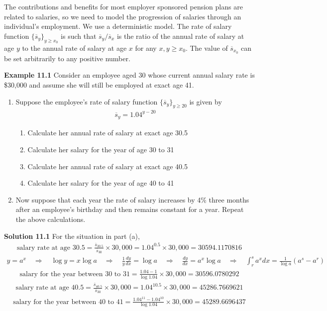 \documentclass[hidelinks, 12pt]{article}
\theoremstyle{mydefstyle}
\theoremstyle{mythmstyle}
\begin{document}
The contributions and benefits for most employer sponsored pension plans are related to salaries, so we need to model the progression of salaries through an individual's employment. We use a deterministic model. The rate of salary function $\{\overline{s}_y\}_{y \ge x_0}$ is such that $\overline{s}_y / \overline{s}_x$ is the ratio of the annual rate of salary at age $y$ to the annual rate of salary at age $x$ for any $x, y \ge x_0$. The value of $\overline{s}_{x_0}$ can be set arbitrarily to any positive number. 

\textbf{Example 11.1} Consider an employee aged 30 whose current annual salary rate is \$30,000 and assume she will still be employed at exact age 41. 
\begin{enumerate}[label = (\alph*)]
\item Suppose the employee's rate of salary function $\{\overline{s}_y\}_{y \ge 20}$ is given by
\begin{gather*}
\overline{s}_y = 1.04^{y-20}
\end{gather*}
\begin{enumerate}[label=(\roman*)]
\item Calculate her annual rate of salary at exact age 30.5
\item Calculate her salary for the year of age 30 to 31
\item Calculate her annual rate of salary at exact age 40.5
\item Calculate her salary for the year of age 40 to 41
\end{enumerate}
\item Now suppose that each year the rate of salary increases by 4\% three months after an employee's birthday and then remains constant for a year. Repeat the above calculations.
\end{enumerate}

\textbf{Solution 11.1} For the situation in part (a),
\begin{gather*}
\mbox{salary rate at age 30.5} 
= \frac{\overline{s}_{30.5}}{\overline{s}_{30}} \times 30,000
= 1.04^{0.5} \times 30,000 = 30594.1170816
\end{gather*}
\begin{gather*}
y = a^x \quad\Rightarrow\quad \log y = x \log a \quad\Rightarrow\quad \frac{1}{y} \frac{dy}{dx} = \log a
\quad\Rightarrow\quad \frac{dy}{dx} = a^x \log a \quad\Rightarrow\quad \int_r^s a^x dx = \frac{1}{\log a} \left( a^s - a^r \right)
\end{gather*}
\begin{gather*}
\mbox{salary for the year between 30 to 31} = \frac{1.04 - 1}{\log 1.04} \times 30,000
= 30596.0780292
\end{gather*}
\begin{gather*}
\mbox{salary rate at age 40.5} 
= \frac{\overline{s}_{40.5}}{\overline{s}_{30}} \times 30,000
= 1.04^{10.5} \times 30,000 = 45286.7669621
\end{gather*}
\begin{gather*}
\mbox{salary for the year between 40 to 41} = \frac{1.04^{11} - 1.04^{10}}{\log 1.04} \times 30,000
= 45289.6696437
\end{gather*}
\end{document}
